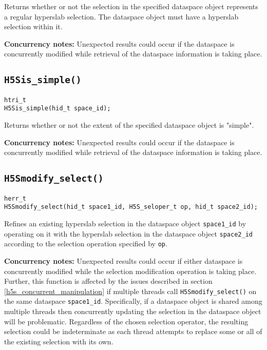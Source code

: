 \documentclass[../HDF5_RFC.tex]{subfiles}
\begin{document}
Returns whether or not the selection in the specified dataspace object represents a regular
hyperslab selection. The dataspace object must have a hyperslab selection within it.

\textbf{Concurrency notes:} Unexpected results could occur if the dataspace is concurrently modified
while retrieval of the dataspace information is taking place.

\subsection{\texttt{H5Sis\_simple()}}
\label{apdx:h5s_func_h5sis_simple}

\begin{verbatim}
htri_t
H5Sis_simple(hid_t space_id);
\end{verbatim}

Returns whether or not the extent of the specified dataspace object is "simple".

\textbf{Concurrency notes:} Unexpected results could occur if the dataspace is concurrently modified
while retrieval of the dataspace information is taking place.

\subsection{\texttt{H5Smodify\_select()}}
\label{apdx:h5s_func_h5smodify_select}

\begin{verbatim}
herr_t
H5Smodify_select(hid_t space1_id, H5S_seloper_t op, hid_t space2_id);
\end{verbatim}

Refines an existing hyperslab selection in the dataspace object \texttt{space1\_id} by operating
on it with the hyperslab selection in the dataspace object \texttt{space2\_id} according to the
selection operation specified by \texttt{op}.

\textbf{Concurrency notes:} Unexpected results could occur if either dataspace is concurrently
modified while the selection modification operation is taking place. Further, this function is
affected by the issues described in section \ref{h5s_concurrent_manipulation} if multiple threads
call \texttt{H5Smodify\_select()} on the same dataspace \texttt{space1\_id}. Specifically, if a 
dataspace object is shared among multiple threads then concurrently updating the selection in
the dataspace object will be problematic. Regardless of the chosen selection operator, the
resulting selection could be indeterminate as each thread attempts to replace some or all of
the existing selection with its own.
\end{document}
